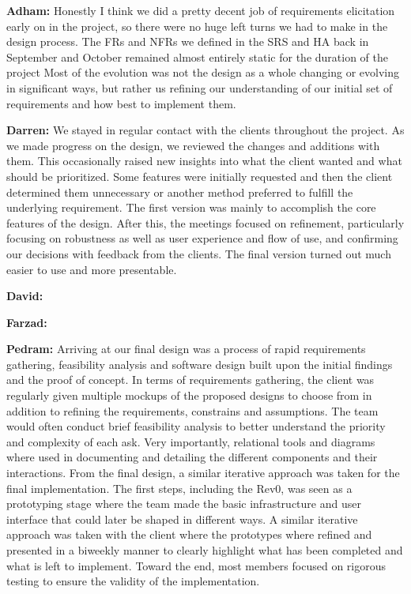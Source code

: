 \documentclass{article}
\begin{document}

\textbf{Adham:} Honestly I think we did a pretty decent job of requirements elicitation early on in the project, so there were no huge left turns we had to make in the design
process. The FRs and NFRs we defined in the SRS and HA back in September and October remained almost entirely static for the duration of the project
Most of the evolution was not the design as a whole changing or evolving in significant ways, but rather us refining our understanding of our initial set of requirements
and how best to implement them.

\textbf{Darren:} We stayed in regular  contact with the clients throughout the project. As we made progress on the design, we reviewed the changes and additions with them.
 This occasionally raised new insights into what the client wanted and what should be prioritized. Some features were initially requested and then the client determined them 
 unnecessary or another method preferred to fulfill the underlying requirement. The first version was mainly to accomplish the core features of the design. After this, the 
 meetings focused on refinement, particularly focusing on robustness as well as user experience and flow of use, and confirming our decisions with feedback from the clients. 
 The final version turned out much easier to use and more presentable.

\textbf{David:}

\textbf{Farzad:}

\textbf{Pedram:} Arriving at our final design was a process of rapid requirements gathering, feasibility analysis and software design built upon the initial findings and the 
proof of concept. In terms of requirements gathering, the client was regularly given multiple mockups of the proposed designs to choose from in addition to refining the 
requirements, constrains and assumptions. The team would often conduct brief feasibility analysis to better understand the priority and complexity of each ask. 
Very importantly, relational tools and diagrams where used in documenting and detailing the different components and their interactions.  
From the final design, a similar iterative approach was taken for the final implementation. 
The first steps, including the Rev0, was seen as a prototyping stage where the team made the basic infrastructure and user interface that could later be shaped in different 
ways. A similar iterative approach was taken with the client where the prototypes where refined and presented in a biweekly manner to clearly highlight what has been completed 
and what is left to implement. Toward the end, most members focused on rigorous testing to ensure the validity of the implementation.\\
\end{document}
